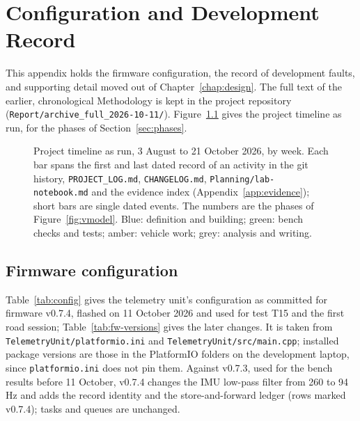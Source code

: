 \chapter{Configuration and Development Record}
\label{app:devrecord}

This appendix holds the firmware configuration, the record of development faults, and supporting detail moved out of Chapter~\ref{chap:design}. The full text of the earlier, chronological Methodology is kept in the project repository (\texttt{Report/\allowbreak{}archive\_\allowbreak{}full\_\allowbreak{}2026-10-11/}). Figure~\ref{fig:timeline} gives the project timeline as run, for the phases of Section~\ref{sec:phases}.

\begin{figure}[htbp]
\centering

\caption[Project timeline as run, 3 August to 21 October 2026, by week]{Project timeline as run, 3 August to 21 October 2026, by week. Each bar spans the first and last dated record of an activity in the git history, \texttt{PROJECT\_LOG.md}, \texttt{CHANGELOG.md}, \texttt{Planning/lab-notebook.md} and the evidence index (Appendix~\ref{app:evidence}); short bars are single dated events. The numbers are the phases of Figure~\ref{fig:vmodel}. Blue: definition and building; green: bench checks and tests; amber: vehicle work; grey: analysis and writing.}
\label{fig:timeline}
\end{figure}

\section{Firmware configuration}

Table~\ref{tab:config} gives the telemetry unit's configuration as committed for firmware v0.7.4, flashed on 11 October 2026 and used for test T15 and the first road session; Table~\ref{tab:fw-versions} gives the later changes. It is taken from \texttt{TelemetryUnit/\allowbreak{}platformio.ini} and \texttt{TelemetryUnit/\allowbreak{}src/\allowbreak{}main.cpp}; installed package versions are those in the PlatformIO folders on the development laptop, since \texttt{platformio.ini} does not pin them. Against v0.7.3, used for the bench results before 11 October, v0.7.4 changes the IMU low-pass filter from 260 to 94\,Hz and adds the record identity and the store-and-forward ledger (rows marked v0.7.4); tasks and queues are unchanged.

